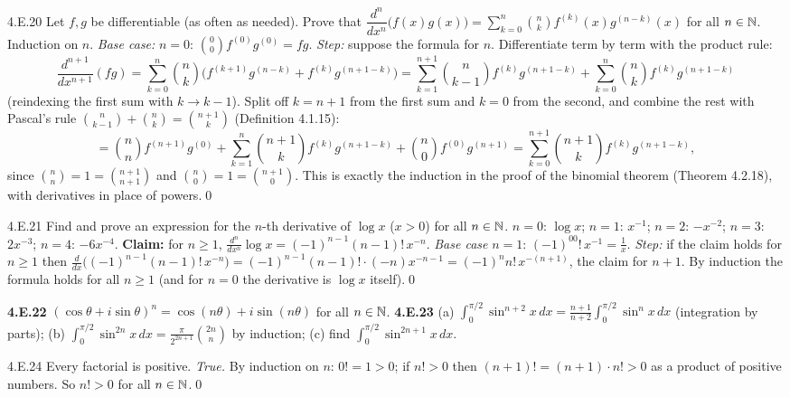 \begin{bookex}[essential]{4.E.20}
Let $f,g$ be differentiable (as often as needed). Prove that $\dfrac{d^n}{dx^n}\big(f(x)g(x)\big)=\sum_{k=0}^n\binom nkf^{(k)}(x)g^{(n-k)}(x)$ for all $n\in\mathbb{N}$.
\solution
Induction on $n$. \emph{Base case:} $n=0$: $\binom00f^{(0)}g^{(0)}=fg$. \emph{Step:} suppose the formula for $n$. Differentiate term by term with the product rule:
\[
\frac{d^{n+1}}{dx^{n+1}}(fg)=\sum_{k=0}^n\binom nk\big(f^{(k+1)}g^{(n-k)}+f^{(k)}g^{(n+1-k)}\big)=\sum_{k=1}^{n+1}\binom n{k-1}f^{(k)}g^{(n+1-k)}+\sum_{k=0}^n\binom nkf^{(k)}g^{(n+1-k)}
\]
(reindexing the first sum with $k\to k-1$). Split off $k=n+1$ from the first sum and $k=0$ from the second, and combine the rest with Pascal's rule $\binom n{k-1}+\binom nk=\binom{n+1}k$ (Definition 4.1.15):
\[
=\binom nnf^{(n+1)}g^{(0)}+\sum_{k=1}^n\binom{n+1}kf^{(k)}g^{(n+1-k)}+\binom n0f^{(0)}g^{(n+1)}=\sum_{k=0}^{n+1}\binom{n+1}kf^{(k)}g^{(n+1-k)},
\]
since $\binom nn=1=\binom{n+1}{n+1}$ and $\binom n0=1=\binom{n+1}0$. This is exactly the induction in the proof of the binomial theorem (Theorem 4.2.18), with derivatives in place of powers.\qed
\end{bookex}

\begin{bookex}[recommended]{4.E.21}
Find and prove an expression for the $n$-th derivative of $\log x$ ($x>0$) for all $n\in\mathbb{N}$.
\solution
$n=0$: $\log x$; $n=1$: $x^{-1}$; $n=2$: $-x^{-2}$; $n=3$: $2x^{-3}$; $n=4$: $-6x^{-4}$. \textbf{Claim:} for $n\ge1$, $\frac{d^n}{dx^n}\log x=(-1)^{n-1}(n-1)!\,x^{-n}$. \emph{Base case} $n=1$: $(-1)^00!\,x^{-1}=\frac1x$. \emph{Step:} if the claim holds for $n\ge1$ then $\frac d{dx}\big((-1)^{n-1}(n-1)!\,x^{-n}\big)=(-1)^{n-1}(n-1)!\cdot(-n)x^{-n-1}=(-1)^nn!\,x^{-(n+1)}$, the claim for $n+1$. By induction the formula holds for all $n\ge1$ (and for $n=0$ the derivative is $\log x$ itself).\qed
\end{bookex}

\begin{trybox}[{4.E.22, 4.E.23 \fO}]
\textbf{4.E.22} $(\cos\theta+i\sin\theta)^n=\cos(n\theta)+i\sin(n\theta)$ for all $n\in\mathbb{N}$. \quad \textbf{4.E.23} (a) $\int_0^{\pi/2}\sin^{n+2}x\,dx=\frac{n+1}{n+2}\int_0^{\pi/2}\sin^nx\,dx$ (integration by parts); (b) $\int_0^{\pi/2}\sin^{2n}x\,dx=\frac{\pi}{2^{2n+1}}\binom{2n}n$ by induction; (c) find $\int_0^{\pi/2}\sin^{2n+1}x\,dx$.
\end{trybox}

\begin{bookex}[recommended]{4.E.24}
Every factorial is positive.
\solution
\emph{True.} By induction on $n$: $0!=1>0$; if $n!>0$ then $(n+1)!=(n+1)\cdot n!>0$ as a product of positive numbers. So $n!>0$ for all $n\in\mathbb{N}$.\qed
\end{bookex}

